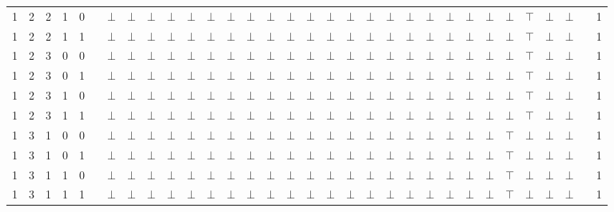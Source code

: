 \documentclass[12pt]{extarticle}
\begin{document}
\begin{landscape}
\begin{tiny}
\begin{longtable}[c]{llllllllllllllllllllllllllllllll}
1 & 2 & 2 & 1 & 0 &  & $\bot$ & $\bot$ & $\bot$ & $\bot$ & $\bot$ & $\bot$ & $\bot$ & $\bot$ & $\bot$ & $\bot$ & $\bot$ & $\bot$ & $\bot$ & $\bot$ & $\bot$ & $\bot$ & $\bot$ & $\bot$ & $\bot$ & $\bot$ & $\bot$ & $\top$ & $\bot$ & $\bot$ &  & 1 \\
1 & 2 & 2 & 1 & 1 &  & $\bot$ & $\bot$ & $\bot$ & $\bot$ & $\bot$ & $\bot$ & $\bot$ & $\bot$ & $\bot$ & $\bot$ & $\bot$ & $\bot$ & $\bot$ & $\bot$ & $\bot$ & $\bot$ & $\bot$ & $\bot$ & $\bot$ & $\bot$ & $\bot$ & $\top$ & $\bot$ & $\bot$ &  & 1 \\
1 & 2 & 3 & 0 & 0 &  & $\bot$ & $\bot$ & $\bot$ & $\bot$ & $\bot$ & $\bot$ & $\bot$ & $\bot$ & $\bot$ & $\bot$ & $\bot$ & $\bot$ & $\bot$ & $\bot$ & $\bot$ & $\bot$ & $\bot$ & $\bot$ & $\bot$ & $\bot$ & $\bot$ & $\top$ & $\bot$ & $\bot$ &  & 1 \\
1 & 2 & 3 & 0 & 1 &  & $\bot$ & $\bot$ & $\bot$ & $\bot$ & $\bot$ & $\bot$ & $\bot$ & $\bot$ & $\bot$ & $\bot$ & $\bot$ & $\bot$ & $\bot$ & $\bot$ & $\bot$ & $\bot$ & $\bot$ & $\bot$ & $\bot$ & $\bot$ & $\bot$ & $\top$ & $\bot$ & $\bot$ &  & 1 \\
1 & 2 & 3 & 1 & 0 &  & $\bot$ & $\bot$ & $\bot$ & $\bot$ & $\bot$ & $\bot$ & $\bot$ & $\bot$ & $\bot$ & $\bot$ & $\bot$ & $\bot$ & $\bot$ & $\bot$ & $\bot$ & $\bot$ & $\bot$ & $\bot$ & $\bot$ & $\bot$ & $\bot$ & $\top$ & $\bot$ & $\bot$ &  & 1 \\
1 & 2 & 3 & 1 & 1 &  & $\bot$ & $\bot$ & $\bot$ & $\bot$ & $\bot$ & $\bot$ & $\bot$ & $\bot$ & $\bot$ & $\bot$ & $\bot$ & $\bot$ & $\bot$ & $\bot$ & $\bot$ & $\bot$ & $\bot$ & $\bot$ & $\bot$ & $\bot$ & $\bot$ & $\top$ & $\bot$ & $\bot$ &  & 1 \\
1 & 3 & 1 & 0 & 0 &  & $\bot$ & $\bot$ & $\bot$ & $\bot$ & $\bot$ & $\bot$ & $\bot$ & $\bot$ & $\bot$ & $\bot$ & $\bot$ & $\bot$ & $\bot$ & $\bot$ & $\bot$ & $\bot$ & $\bot$ & $\bot$ & $\bot$ & $\bot$ & $\top$ & $\bot$ & $\bot$ & $\bot$ &  & 1 \\
1 & 3 & 1 & 0 & 1 &  & $\bot$ & $\bot$ & $\bot$ & $\bot$ & $\bot$ & $\bot$ & $\bot$ & $\bot$ & $\bot$ & $\bot$ & $\bot$ & $\bot$ & $\bot$ & $\bot$ & $\bot$ & $\bot$ & $\bot$ & $\bot$ & $\bot$ & $\bot$ & $\top$ & $\bot$ & $\bot$ & $\bot$ &  & 1 \\
1 & 3 & 1 & 1 & 0 &  & $\bot$ & $\bot$ & $\bot$ & $\bot$ & $\bot$ & $\bot$ & $\bot$ & $\bot$ & $\bot$ & $\bot$ & $\bot$ & $\bot$ & $\bot$ & $\bot$ & $\bot$ & $\bot$ & $\bot$ & $\bot$ & $\bot$ & $\bot$ & $\top$ & $\bot$ & $\bot$ & $\bot$ &  & 1 \\
1 & 3 & 1 & 1 & 1 &  & $\bot$ & $\bot$ & $\bot$ & $\bot$ & $\bot$ & $\bot$ & $\bot$ & $\bot$ & $\bot$ & $\bot$ & $\bot$ & $\bot$ & $\bot$ & $\bot$ & $\bot$ & $\bot$ & $\bot$ & $\bot$ & $\bot$ & $\bot$ & $\top$ & $\bot$ & $\bot$ & $\bot$ &  & 1 \\

\end{longtable}
\end{tiny}
\end{landscape}
\end{document}
